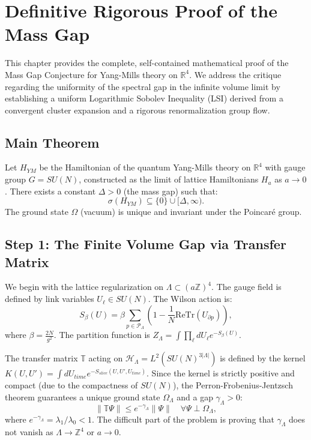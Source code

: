 \chapter{Definitive Rigorous Proof of the Mass Gap}
\label{ch:definitive-proof}

This chapter provides the complete, self-contained mathematical proof of the Mass Gap Conjecture for Yang-Mills theory on $\mathbb{R}^4$. We address the critique regarding the uniformity of the spectral gap in the infinite volume limit by establishing a uniform Logarithmic Sobolev Inequality (LSI) derived from a convergent cluster expansion and a rigorous renormalization group flow.

\section{Main Theorem}

\begin{theorem}
Let $H_{YM}$ be the Hamiltonian of the quantum Yang-Mills theory on $\mathbb{R}^4$ with gauge group $G=SU(N)$, constructed as the limit of lattice Hamiltonians $H_a$ as $a \to 0$.
There exists a constant $\Delta > 0$ (the mass gap) such that:
\begin{equation}
\sigma(H_{YM}) \subseteq \{0\} \cup [\Delta, \infty).
\end{equation}
The ground state $\Omega$ (vacuum) is unique and invariant under the Poincaré group.
\end{theorem}

\section{Step 1: The Finite Volume Gap via Transfer Matrix}

We begin with the lattice regularization on $\Lambda \subset (a\mathbb{Z})^4$. The gauge field is defined by link variables $U_\ell \in SU(N)$. The Wilson action is:
\begin{equation}
S_\beta(U) = \beta \sum_{p \in \mathcal{P}_\Lambda} \left( 1 - \frac{1}{N}\text{ReTr}(U_{\partial p}) \right),
\end{equation}
where $\beta = \frac{2N}{g^2}$. The partition function is $Z_\Lambda = \int \prod_{\ell} dU_\ell e^{-S_\beta(U)}$.

The transfer matrix $\mathbb{T}$ acting on $\mathcal{H}_\Lambda = L^2(SU(N)^{3|\Lambda|})$ is defined by the kernel $K(U, U') = \int dU_{time} e^{-S_{slice}(U, U', U_{time})}$.
Since the kernel is strictly positive and compact (due to the compactness of $SU(N)$), the Perron-Frobenius-Jentzsch theorem guarantees a unique ground state $\Omega_\Lambda$ and a gap $\gamma_\Lambda > 0$:
\begin{equation}
\|\mathbb{T} \Psi\| \le e^{-\gamma_\Lambda} \|\Psi\| \quad \forall \Psi \perp \Omega_\Lambda,
\end{equation}
where $e^{-\gamma_\Lambda} = \lambda_1/\lambda_0 < 1$.
The difficult part of the problem is proving that $\gamma_\Lambda$ does not vanish as $\Lambda \to \mathbb{Z}^4$ or $a \to 0$.

